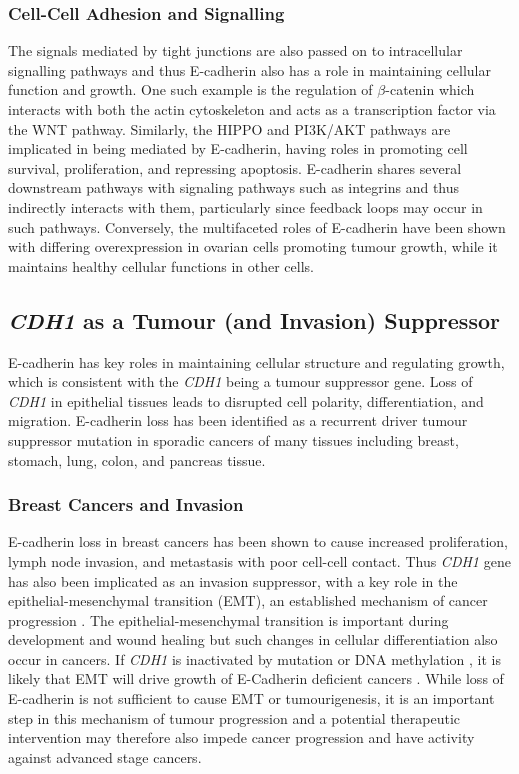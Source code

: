 \subsubsection{Cell-Cell Adhesion and Signalling}
The signals mediated by tight junctions are also passed on to intracellular signalling pathways and thus E-cadherin also has a role in maintaining cellular function and growth. One such example is the regulation of $\beta$-catenin which interacts with both the actin cytoskeleton and acts as a transcription factor via the WNT pathway. Similarly, the HIPPO and PI3K/AKT pathways are implicated in being mediated by E-cadherin, having roles in promoting cell survival, proliferation, and repressing apoptosis. E-cadherin shares several downstream pathways with signaling pathways such as integrins and thus indirectly interacts with them, particularly since feedback loops may occur in such pathways. Conversely, the multifaceted roles of E-cadherin have been shown with differing overexpression in ovarian cells promoting tumour growth, while it maintains healthy cellular functions in other cells.

\subsection{\textit{CDH1} as a Tumour (and Invasion) Suppressor}
E-cadherin has key roles in maintaining cellular structure and regulating growth, which is consistent with the \textit{CDH1} being a tumour suppressor gene. Loss of \textit{CDH1} in epithelial tissues leads to disrupted cell polarity, differentiation, and  migration. E-cadherin loss has been identified as a recurrent driver tumour suppressor mutation in sporadic cancers of many tissues including breast, stomach, lung, colon, and pancreas tissue.

\subsubsection{Breast Cancers and Invasion}
E-cadherin loss in breast cancers has been shown to cause increased proliferation, lymph node invasion, and metastasis with poor cell-cell contact. Thus \textit{CDH1} gene has also been implicated as an invasion suppressor, with a key role in the epithelial-mesenchymal transition (EMT), an established mechanism of cancer progression \cite{Hanahan2011}. The epithelial-mesenchymal transition is important during development and wound healing but such changes in cellular differentiation also occur in cancers. If \textit{CDH1} is inactivated by mutation or DNA methylation \cite{Berx1996,Guilford1999,Machado2001}, it is likely that EMT will drive growth of E-Cadherin deficient cancers \cite{Berx2009,Graziano2003,Polyak2009}. While loss of E-cadherin is not sufficient to cause EMT or tumourigenesis, it is an important step in this mechanism of tumour progression and a potential therapeutic intervention may therefore also impede cancer progression and have activity against advanced stage cancers.

